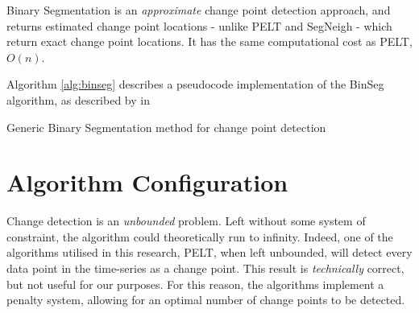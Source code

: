 \documentclass[../main.tex]{subfiles}
\begin{document}
Binary Segmentation is an \emph{approximate} change point detection approach, and returns estimated change point locations - unlike PELT and SegNeigh - which return exact change point locations. It has the same computational cost as PELT, $O(n)$.

Algorithm \autoref{alg:binseg} describes a pseudocode implementation of the BinSeg algorithm, as described by \citeauthor{Eckley2011} in  \cite{Eckley2011}\newline

\begin{algorithm}[H]
    \label{alg:binseg}
    \caption{Generic Binary Segmentation method for change point detection}
    \DontPrintSemicolon
    \bigskip
\end{algorithm}

\section{Algorithm Configuration}

Change detection is an \emph{unbounded} problem. Left without some system of constraint, the algorithm could theoretically run to infinity. Indeed, one of the algorithms utilised in this research, PELT, when left unbounded, will detect every data point in the time-series as a change point. This result is \textit{technically} correct, but not useful for our purposes. For this reason, the algorithms implement a penalty system, allowing for an optimal number of change points to be detected.
\end{document}
